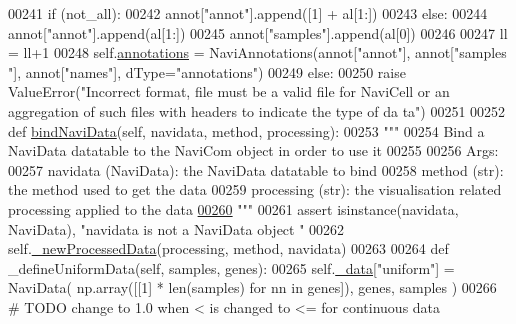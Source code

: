 \begin{DoxyCode}
00241                     \textcolor{keywordflow}{if} (not\_all):
00242                         annot[\textcolor{stringliteral}{"annot"}].append([1] + al[1:])
00243                     \textcolor{keywordflow}{else}:
00244                         annot[\textcolor{stringliteral}{"annot"}].append(al[1:])
00245                     annot[\textcolor{stringliteral}{"samples"}].append(al[0])
00246 
00247                     ll = ll+1
00248                 self.\hyperlink{classnavicom_1_1navicom_1_1NaviCom_a0386d881214943cf3432d0ffe22cbb71}{annotations} = NaviAnnotations(annot[\textcolor{stringliteral}{"annot"}], annot[\textcolor{stringliteral}{"samples
      "}], annot[\textcolor{stringliteral}{"names"}], dType=\textcolor{stringliteral}{"annotations"})
00249             \textcolor{keywordflow}{else}:
00250                 \textcolor{keywordflow}{raise} ValueError(\textcolor{stringliteral}{"Incorrect format, file must be a valid file for
       NaviCell or an aggregation of such files with headers to indicate the type of da
      ta"})
00251 
00252     \textcolor{keyword}{def }\hyperlink{classnavicom_1_1navicom_1_1NaviCom_ae310adb1d4e8932f0b72b6d8b6ca6301}{bindNaviData}(self, navidata, method, processing):
00253         \textcolor{stringliteral}{"""}
00254 \textcolor{stringliteral}{        Bind a NaviData datatable to the NaviCom object in order to use it }
00255 \textcolor{stringliteral}{}
00256 \textcolor{stringliteral}{        Args:}
00257 \textcolor{stringliteral}{            navidata (NaviData): the NaviData datatable to bind}
00258 \textcolor{stringliteral}{            method (str): the method used to get the data}
00259 \textcolor{stringliteral}{            processing (str): the visualisation related processing applied to the
       data}
\hypertarget{navicom_8py_source_l00260}{}\hyperlink{classnavicom_1_1navicom_1_1NaviCom_ae310adb1d4e8932f0b72b6d8b6ca6301}{00260} \textcolor{stringliteral}{        """}
00261         \textcolor{keyword}{assert} isinstance(navidata, NaviData), \textcolor{stringliteral}{"navidata is not a NaviData object
      "}
00262         self.\hyperlink{classnavicom_1_1navicom_1_1NaviCom_acf8b9094fa76cafefb910daeb68b7e5d}{_newProcessedData}(processing, method, navidata)
00263 
00264     \textcolor{keyword}{def }\_defineUniformData(self, samples, genes):
00265         self.\hyperlink{classnavicom_1_1navicom_1_1NaviCom_a407b2b5c30a5652ee85c4be54b3e6679}{_data}[\textcolor{stringliteral}{"uniform"}] = NaviData( np.array([[1] * len(samples) \textcolor{keywordflow}{for} nn \textcolor{keywordflow}{in} 
      genes]), genes, samples )
00266         \textcolor{comment}{# TODO change to 1.0 when < is changed to <= for continuous data}

\end{DoxyCode}
